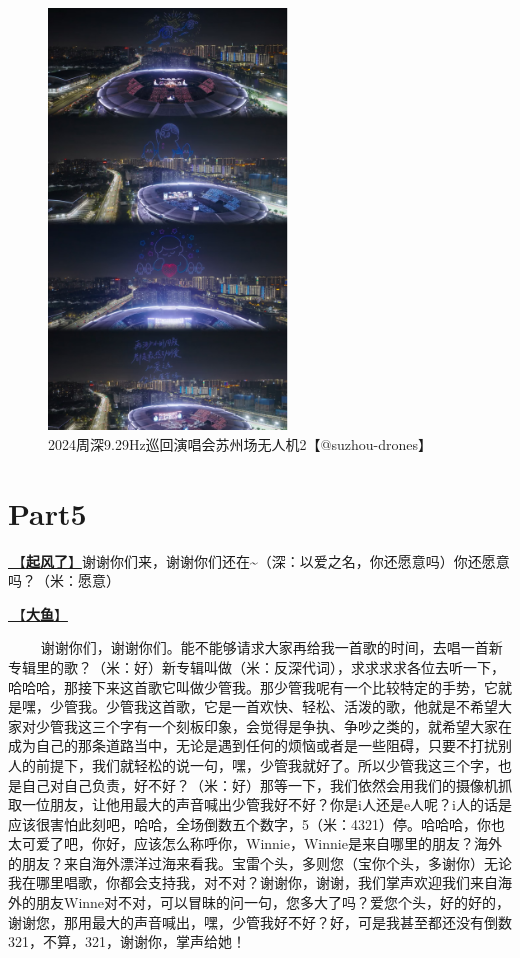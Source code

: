 \documentclass[]{ctexbook}
\begin{document}
\begin{figure}

{\centering \includegraphics[width=180pt]{img/suzhou20241109/002} 

}

\caption{2024周深9.29Hz巡回演唱会苏州场无人机2【@suzhou-drones】}\label{fig:unnamed-chunk-109}
\end{figure}

\section{Part5}\label{suzhou-20241109-part5}

\hyperref[the-wind-rises]{🎵【\textbf{起风了}】}谢谢你们来，谢谢你们还在\textasciitilde（深：以爱之名，你还愿意吗）你还愿意吗？（米：愿意）

\hyperref[big-fish]{🎵【\textbf{大鱼}】}

   谢谢你们，谢谢你们。能不能够请求大家再给我一首歌的时间，去唱一首新专辑里的歌？（米：好）新专辑叫做（米：反深代词），求求求求各位去听一下，哈哈哈，那接下来这首歌它叫做少管我。那少管我呢有一个比较特定的手势，它就是嘿，少管我。少管我这首歌，它是一首欢快、轻松、活泼的歌，他就是不希望大家对少管我这三个字有一个刻板印象，会觉得是争执、争吵之类的，就希望大家在成为自己的那条道路当中，无论是遇到任何的烦恼或者是一些阻碍，只要不打扰别人的前提下，我们就轻松的说一句，嘿，少管我就好了。所以少管我这三个字，也是自己对自己负责，好不好？（米：好）那等一下，我们依然会用我们的摄像机抓取一位朋友，让他用最大的声音喊出少管我好不好？你是i人还是e人呢？i人的话是应该很害怕此刻吧，哈哈，全场倒数五个数字，5（米：4321）停。哈哈哈，你也太可爱了吧，你好，应该怎么称呼你，Winnie，Winnie是来自哪里的朋友？海外的朋友？来自海外漂洋过海来看我。宝雷个头，多则您（宝你个头，多谢你）无论我在哪里唱歌，你都会支持我，对不对？谢谢你，谢谢，我们掌声欢迎我们来自海外的朋友Winne对不对，可以冒昧的问一句，您多大了吗？爱您个头，好的好的，谢谢您，那用最大的声音喊出，嘿，少管我好不好？好，可是我甚至都还没有倒数321，不算，321，谢谢你，掌声给她！
\end{document}
